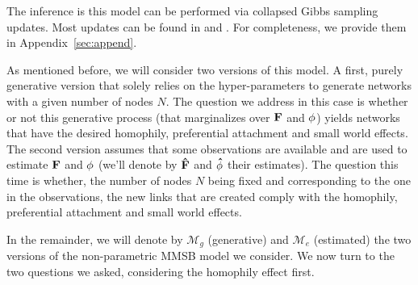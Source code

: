 The inference is this model can be performed via collapsed Gibbs sampling updates. Most updates can be found in \cite{HDP} and \cite{diMMSB}. For completeness, we provide them in Appendix~\ref{sec:append}.

As mentioned before, we will consider two versions of this model. A first, purely generative version that solely relies on the hyper-parameters to generate networks with a given number of nodes $N$. The question we address in this case is whether or not this generative process (that marginalizes over $\mathbf{F}$ and $\mathbf{\phi}$) yields networks that have the desired homophily, preferential attachment and small world effects. The second version assumes that some observations are available and are used to estimate $\mathbf{F}$ and $\mathbf{\phi}$ (we'll denote by $\mathbf{\hat{F}}$ and $\mathbf{\hat{\phi}}$ their estimates). The question this time is whether, the number of nodes $N$ being fixed and corresponding to the one in the observations, the new links that are created comply with the homophily, preferential attachment and small world effects.

In the remainder, we will denote by $\mathcal{M}_g$ (generative) and $\mathcal{M}_e$ (estimated) the two versions of the non-parametric MMSB model we consider. We now turn to the two questions we asked, considering the homophily effect first.